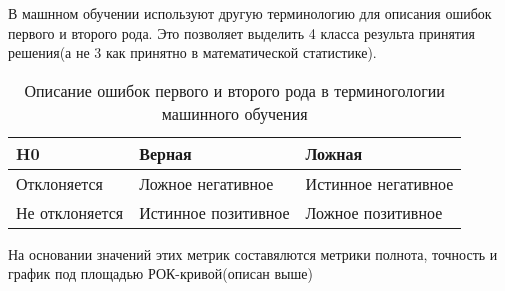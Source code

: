 В машнном обучении используют другую терминологию для описания ошибок первого и второго рода. Это позволяет выделить 4 класса результа принятия решения(а не 3 как принятно в математической статистике).
\begin{table}[!h]
	
	\caption{\label{tab:truefalse2}Описание ошибок первого и второго рода в терминогологии машинного обучения}
	
	\begin{center}
		
		\begin{tabular}{|l|l|l|}
			
			\hline
			
			H0 & Верная & Ложная \\
			
			\hline \hline
			
			Отклоняется & Ложное негативное & Истинное негативное \\
			
			\hline 
			Не отклоняется & Истинное позитивное  & Ложное позитивное\\
			\hline 
			
		\end{tabular}
		
	\end{center}
	
\end{table}
На основании значений этих метрик составялются метрики полнота, точность и график под площадью РОК-кривой(описан выше)

